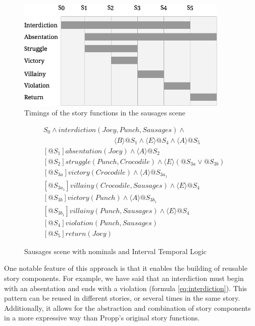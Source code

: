\documentclass{llncs}
\def\mnote#1{\todo[color=Goldenrod,size=\scriptsize]{Matt: #1}}
\begin{document}
\begin{figure}[!t]
  \centering
    \centerline{\includegraphics[width=0.9\textwidth]{durations.png}}
  \caption{Timings of the story functions in the sausages scene}\label{fig:durations}
\end{figure}
\begin{figure}[]
\begin{align}
  &S_{0} \land \mathit{interdiction(Joey, Punch, Sausages)} \land\nonumber\\
  &\qquad\qquad\qquad\qquad\qquad\langle B \rangle @S_{1} \land \langle E \rangle @S_{4} \land \langle A \rangle @S_{5}\label{eq:interdiction}\\
  &[@S_{1}] \mathit{absentation(Joey)} \land \langle A \rangle @S_{2}\label{eq:absentation}\\
  &[@S_{2}] \mathit{struggle(Punch, Crocodile)} \land \langle E \rangle (@S_{3a} \lor @S_{3b})\label{eq:struggle}\\
  &[@S_{3a}] \mathit{victory(Crocodile)} \land \langle A \rangle @S_{3a_1}\\
  &[@S_{3a_1}] \mathit{villainy(Crocodile, Sausages)} \land \langle E \rangle @S_{4}\\
  &[@S_{3b}] \mathit{victory(Punch)} \land \langle A \rangle @S_{3b_1}\\
  &[@S_{3b_1}] \mathit{villainy(Punch, Sausages)} \land \langle E \rangle @S_{4}\\
  &[@S_{4}] \mathit{violation(Punch, Sausages)}\\
  &[@S_{5}] \mathit{return(Joey)}
\end{align}
\caption{Sausages scene with nominals and Interval Temporal Logic}\label{fig:situations}
\end{figure}


One notable feature of this approach is that it enables the building of reusable story components. For example, we have said that an interdiction must begin with an absentation and ends with a violation (formula \ref{eq:interdiction}). This pattern can be reused in different stories, or several times in the same story. Additionally, it allows for the abstraction and combination of story components in a more expressive way than Propp's original story functions.\mnote{Elaborate a bit}
\end{document}
